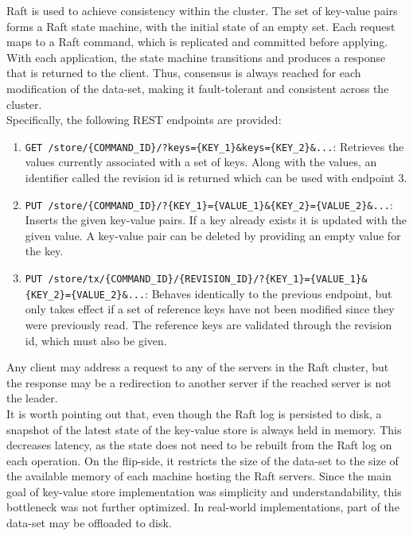Raft is used to achieve consistency within the cluster. The set of key-value pairs forms a Raft state machine, with the initial state of an empty set. Each request maps to a Raft command, which is replicated and committed before applying. With each application, the state machine transitions and produces a response that is returned to the client. Thus, consensus is always reached for each modification of the data-set, making it fault-tolerant and consistent across the cluster.\\

Specifically, the following REST endpoints are provided:
\begin{enumerate}
    \item \lstinline|GET /store/{COMMAND_ID}/?keys={KEY_1}&keys={KEY_2}&...|: Retrieves the values currently associated with a set of keys. Along with the values, an identifier called the revision id is returned which can be used with endpoint 3.
    \item \lstinline|PUT /store/{COMMAND_ID}/?{KEY_1}={VALUE_1}&{KEY_2}={VALUE_2}&...|: Inserts the given key-value pairs. If a key already exists it is updated with the given value. A key-value pair can be deleted by providing an empty value for the key.
    \item \lstinline|PUT /store/tx/{COMMAND_ID}/{REVISION_ID}/?{KEY_1}={VALUE_1}&{KEY_2}={VALUE_2}&...|: Behaves identically to the previous endpoint, but only takes effect if a set of reference keys have not been modified since they were previously read. The reference keys are validated through the revision id, which must also be given.
\end{enumerate}

Any client may address a request to any of the servers in the Raft cluster, but the response may be a redirection to another server if the reached server is not the leader.\\

It is worth pointing out that, even though the Raft log is persisted to disk, a snapshot of the latest state of the key-value store is always held in memory. This decreases latency, as the state does not need to be rebuilt from the Raft log on each operation. On the flip-side, it restricts the size of the data-set to the size of the available memory of each machine hosting the Raft servers. Since the main goal of key-value store implementation was simplicity and understandability, this bottleneck was not further optimized. In real-world implementations, part of the data-set may be offloaded to disk.

